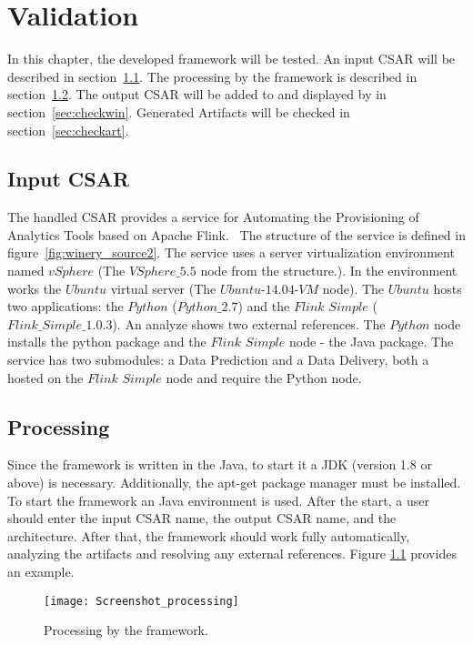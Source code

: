
\chapter{Validation}\label{chap:check}
In this chapter, the developed framework will be tested.
An input CSAR will be described in section~\ref{sec:inputcsar}.
The processing by the framework is described in section~\ref{sec:process}.
The output CSAR will be added to and displayed by  in section~\ref{sec:checkwin}.
Generated Artifacts will be checked in section~\ref{sec:checkart}.

\section{Input CSAR}\label{sec:inputcsar}
The handled CSAR provides a service for Automating the Provisioning of Analytics Tools based on Apache Flink.~\cite{csar_test}
The structure of the service is defined in figure~\ref{fig:winery_source2}. 
The service uses a server virtualization environment named $vSphere$ (The $VSphere\_5.5$ node from the structure.). 
In the environment works the $Ubuntu$ virtual server (The $Ubuntu$-$14.04$-$VM$ node).
The $Ubuntu$ hosts two applications: the $Python$ ($Python\_2.7$) and the $Flink$ $Simple$ ($Flink\_Simple\_1.0.3$).
An analyze shows two external references. The $Python$ node installs the python package and the $Flink$ $Simple$ node - the Java package.
The service has two submodules: a Data Prediction and a Data Delivery, both a hosted on the $Flink$ $Simple$ node and require the Python node. 

\section{Processing}\label{sec:process}
Since the framework is written in the Java, to start it a JDK (version 1.8 or above) is necessary.
Additionally, the apt-get package manager must be installed. 
To start the framework an Java environment is used.
After the start, a user should enter the input CSAR name, the output CSAR name, and the architecture.
After that, the framework should work fully automatically, analyzing the artifacts and resolving any external references.
Figure \ref{fig:process} provides an example.
\begin{figure}[ht]   
	\centering
	\texttt{[image: Screenshot\_processing]}
	\caption{Processing by the framework.}
	\label{fig:process}
\end{figure}

